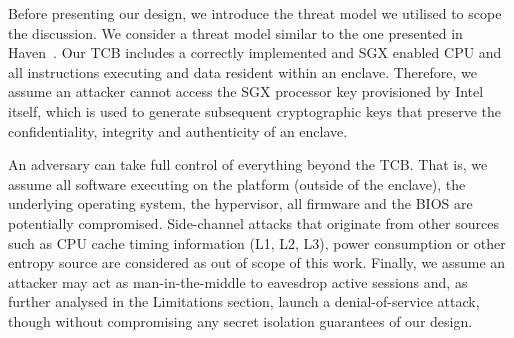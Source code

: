 \documentclass[../main.tex]{subfiles}
\begin{document}
Before presenting our design, we introduce the threat model we
utilised to scope the discussion. We consider a threat model similar
to the one presented in Haven~\cite{Baumann14}. Our TCB includes a
correctly implemented and SGX enabled CPU and all instructions
executing and data resident within an enclave. Therefore, we assume an
attacker cannot access the SGX processor key provisioned by Intel
itself, which is used to generate subsequent cryptographic keys that
preserve the confidentiality, integrity and authenticity of an
enclave.

An adversary can take full control of everything beyond the TCB. That
is, we assume all software executing on the platform (outside of the
enclave), the underlying operating system, the hypervisor, all
firmware and the BIOS are potentially compromised. Side-channel
attacks that originate from other sources such as CPU cache timing
information (L1, L2, L3), power consumption or other entropy source
are considered as out of scope of this work. Finally, we assume an
attacker may act as man-in-the-middle to eavesdrop active sessions
and, as further analysed in the Limitations section, launch a
denial-of-service attack, though without compromising any secret
isolation guarantees of our design.
\end{document}
